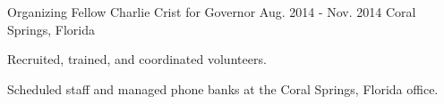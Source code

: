 \begin{cventries}
  \cventry
    {Organizing Fellow} %
    {Charlie Crist for Governor} %
    {Aug. 2014 - Nov. 2014} %
    {Coral Springs, Florida} %
    {
      \begin{cvitems} %
        \item {Recruited, trained, and coordinated volunteers.}
        \item {Scheduled staff and managed phone banks at the Coral Springs, Florida office.}
      \end{cvitems}
    }

\end{cventries}
